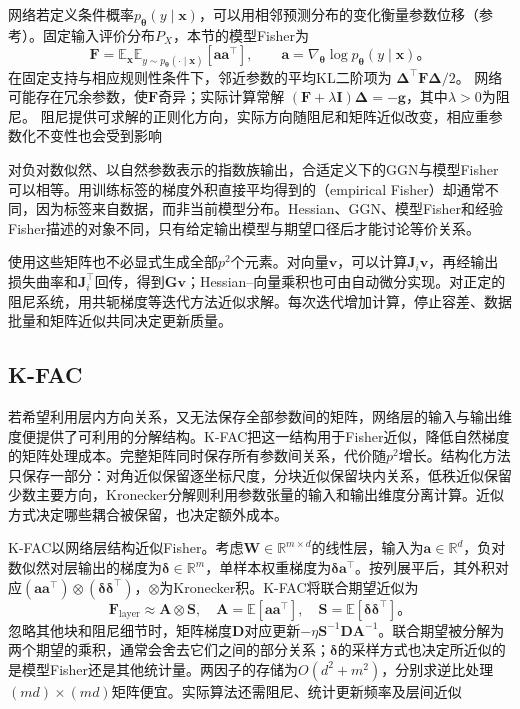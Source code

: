 网络若定义条件概率$p_{\bm\theta}(y\mid\bm x)$，可以用相邻预测分布的变化衡量参数位移（参考）。固定输入评价分布$P_X$，本节的模型Fisher为
\begin{equation}
  \bm F=\mathbb E_{\bm x}\mathbb E_{y\sim p_{\bm\theta}(\cdot\mid\bm x)}
    [\bm a\bm a^{\top}],\qquad
  \bm a=\nabla_{\bm\theta}\log p_{\bm\theta}(y\mid\bm x)\text{。}
  \label{eq:training-fisher}
\end{equation}
在固定支持与相应规则性条件下，邻近参数的平均KL二阶项为
$\bm\Delta^\top\bm F\bm\Delta/2$。
网络可能存在冗余参数，使$\bm F$奇异；实际计算常解
$(\bm F+\lambda\bm I)\bm\Delta=-\bm g$，其中$\lambda>0$为阻尼。
阻尼提供可求解的正则化方向，实际方向随阻尼和矩阵近似改变，相应重参数化不变性也会受到影响

对负对数似然、以自然参数表示的指数族输出，合适定义下的GGN与模型Fisher可以相等。用训练标签的梯度外积直接平均得到的（empirical Fisher）却通常不同，因为标签来自数据，而非当前模型分布。Hessian、GGN、模型Fisher和经验Fisher描述的对象不同，只有给定输出模型与期望口径后才能讨论等价关系。

使用这些矩阵也不必显式生成全部$p^2$个元素。对向量$\bm v$，可以计算$\bm J_i\bm v$，再经输出损失曲率和$\bm J_i^{\top}$回传，得到$\bm G\bm v$；Hessian--向量乘积也可由自动微分实现。对正定的阻尼系统，用共轭梯度等迭代方法近似求解。每次迭代增加计算，停止容差、数据批量和矩阵近似共同决定更新质量。

\subsection{K-FAC}
\label{sec:training-structured-preconditioning}

若希望利用层内方向关系，又无法保存全部参数间的矩阵，网络层的输入与输出维度便提供了可利用的分解结构。K-FAC把这一结构用于Fisher近似，降低自然梯度的矩阵处理成本。完整矩阵同时保存所有参数间关系，代价随$p^2$增长。结构化方法只保存一部分：对角近似保留逐坐标尺度，分块近似保留块内关系，低秩近似保留少数主要方向，Kronecker分解则利用参数张量的输入和输出维度分离计算。近似方式决定哪些耦合被保留，也决定额外成本。

K-FAC以网络层结构近似Fisher。考虑$\bm W\in\mathbb R^{m\times d}$的线性层，输入为$\bm a\in\mathbb R^d$，负对数似然对层输出的梯度为$\bm\delta\in\mathbb R^m$，单样本权重梯度为$\bm\delta\bm a^{\top}$。按列展平后，其外积对应$(\bm a\bm a^{\top})\otimes(\bm\delta\bm\delta^{\top})$，$\otimes$为Kronecker积。K-FAC将联合期望近似为
\begin{equation}
  \bm F_{\mathrm{layer}}\approx\bm A\otimes\bm S,
  \quad\bm A=\mathbb E[\bm a\bm a^{\top}],\quad
  \bm S=\mathbb E[\bm\delta\bm\delta^{\top}]\text{。}
  \label{eq:training-kfac}
\end{equation}
忽略其他块和阻尼细节时，矩阵梯度$\bm D$对应更新$-\eta\bm S^{-1}\bm D\bm A^{-1}$。联合期望被分解为两个期望的乘积，通常会舍去它们之间的部分关系；$\bm\delta$的采样方式也决定所近似的是模型Fisher还是其他统计量。两因子的存储为$O(d^2+m^2)$，分别求逆比处理$(md)\times(md)$矩阵便宜。实际算法还需阻尼、统计更新频率及层间近似

